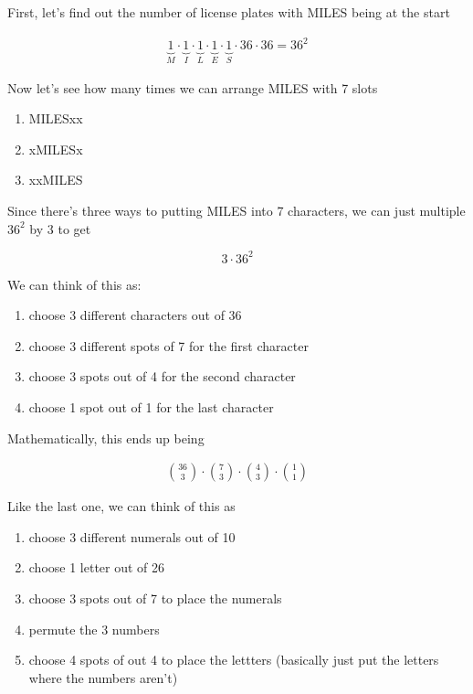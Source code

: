 \documentclass[../Main.tex]{subfiles}
\begin{document}
\begin{alphabet}
    \item
    {
        First, let's find out the number of license plates with MILES being at the start

        \begin{align*}
            \underbrace{1}_M \cdot \underbrace{1}_I \cdot \underbrace{1}_L \cdot \underbrace{1}_E \cdot \underbrace{1}_S \cdot 36 \cdot 36 = 36^2
        \end{align*}

        Now let's see how many times we can arrange MILES with 7 slots

        \begin{enumerate}
            \item MILESxx
            \item xMILESx
            \item xxMILES
        \end{enumerate}

        Since there's three ways to putting MILES into 7 characters, we can just multiple $36^2$ by 3 to get

        $$\boxed{3 \cdot 36^2}$$
    }

    \item
    {
        We can think of this as:

        \begin{enumerate}
            \item choose 3 different characters out of 36
            \item choose 3 different spots of 7 for the first character
            \item choose 3 spots out of 4 for the second character
            \item choose 1 spot out of 1 for the last character
        \end{enumerate}

        Mathematically, this ends up being

        \begin{align*}
            \boxed{{36 \choose 3} \cdot {7 \choose 3} \cdot {4 \choose 3} \cdot {1 \choose 1}}
        \end{align*}
    }

    \item 
    {
        Like the last one, we can think of this as

        \begin{enumerate}
            \item choose 3 different numerals out of 10
            \item choose 1 letter out of 26
            \item choose 3 spots out of 7 to place the numerals 
            \item permute the 3 numbers
            \item choose 4 spots of out 4 to place the lettters (basically just put the letters where the numbers aren't)
        \end{enumerate}

}
\end{alphabet}
\end{document}
